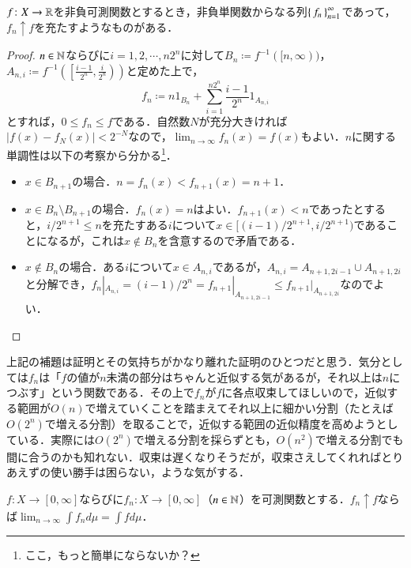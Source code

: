 \begin{lem}\label{非負単関数の列}
$f \colon X \to \mathbb{R}$を非負可測関数とするとき，非負単関数からなる列$\set{f_n}_{n=1}^\infty$であって，$f_n \uparrow f$を充たすようなものがある．
\end{lem}

\begin{proof}
$n \in \mathbb{N}$ならびに$i = 1,2,\cdots, n2^n$に対して$B_n \coloneqq f^{-1}([n,\infty))$，$A_{n,i} \coloneqq f^{-1}\left(\left[\frac{i-1}{2^n},\frac{i}{2^n}\right)\right)$と定めた上で，
\begin{equation}
f_n \coloneqq n 1_{B_n} + \sum_{i=1}^{n2^n} \frac{i-1}{2^n} 1_{A_{n,i}}
\end{equation}とすれば，$0 \leq f_n \leq f$である．自然数$N$が充分大きければ$|f(x) - f_N(x)| < 2^{-N}$なので，$\lim_{n \to \infty}f_n(x)=f(x)$もよい．$n$に関する単調性は以下の考察から分かる\footnote{ここ，もっと簡単にならないか？}．
\begin{itemize}
\item $x \in B_{n+1}$の場合．$n = f_n(x) < f_{n+1}(x) = n+1$．
\item $x \in B_{n} \setminus B_{n+1}$の場合．$f_n(x)=n$はよい．$f_{n+1}(x) < n$であったとすると，$i /2^{n+1} \leq n$を充たすある$i$について$x \in [(i-1)/2^{n+1}, i/2^{n+1})$であることになるが，これは$x \notin B_n$を含意するので矛盾である．
\item $x \notin B_n$の場合．ある$i$について$x \in A_{n,i}$であるが，$A_{n,i} = A_{n+1, 2i-1} \cup A_{n+1, 2i}$と分解でき，$f_n|_{A_{n,i}} = (i-1)/2^n = f_{n+1}|_{A_{n+1,2i-1}} \leq f_{n+1}|_{A_{n+1,2i}}$なのでよい．
\end{itemize}
\end{proof}

\begin{dig}
上記の補題は証明とその気持ちがかなり離れた証明のひとつだと思う．気分としては$f_n$は「$f$の値が$n$未満の部分はちゃんと近似する気があるが，それ以上は$n$につぶす」という関数である．その上で$f_n$が$f$に各点収束してほしいので，近似する範囲が$O(n)$で増えていくことを踏まえてそれ以上に細かい分割（たとえば$O(2^n)$で増える分割）を取ることで，近似する範囲の近似精度を高めようとしている．実際には$O(2^n)$で増える分割を採らずとも，$O(n^2)$で増える分割でも間に合うのかも知れない．収束は遅くなりそうだが，収束さえしてくれればとりあえずの使い勝手は困らない，ような気がする．
\end{dig}

\begin{thm}
$f \colon X \to [0,\infty]$ならびに$f_n \colon X \to [0,\infty]$（$n \in \mathbb{N}$）を可測関数とする．$f_n \uparrow f$ならば$\lim_{n \to \infty} \int f_n d\mu = \int f d\mu$．
\end{thm}

